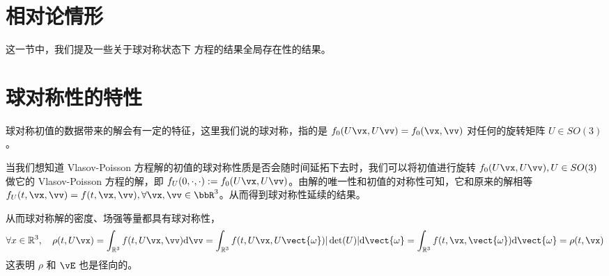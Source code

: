 
\section{相对论情形}
\label{cha:global-RVP}
这一节中，我们提及一些关于球对称状态下 \eqrvp 方程的结果全局存在性的结果。

\section{球对称性的特性}
球对称初值的数据带来的解会有一定的特征，这里我们说的球对称，指的是 $f_0(U\vx,U\vv)=f_0(\vx,\vv)$ 对任何的旋转矩阵 $U\in SO(3)$。

当我们想知道 Vlasov-Poisson 方程解的初值的球对称性质是否会随时间延拓下去时，我们可以将初值进行旋转 $f_0(U\vx,U\vv), U\in SO(3)$ 做它的 Vlasov-Poisson 方程的解，即 $f_U(0,\cdot,\cdot):=f_0(U\vx,U\vv)$。由解的唯一性和初值的对称性可知，它和原来的解相等 $f_U(t,\vx,\vv) = f(t,\vx,\vv), \forall \vx,\vv \in \bbR^3$。从而得到球对称性延续的结果。

从而球对称解的密度、场强等量都具有球对称性，
\[
\forall x \in \mathbb{R}^{3}, \quad \rho(t, U \vx)=\int_{\mathbb{R}^{3}} f(t, U\vx, \vv) \mathrm{d} \vv=\int_{\mathbb{R}^{3}} f(t, U \vx, U \vect{\omega})|\operatorname{det}(U)| \mathrm{d} \vect{\omega}=\int_{\mathbb{R}^{3}} f(t, \vx, \vect{\omega}) \mathrm{d} \vect{\omega}=\rho(t, \vx)
\]
这表明 $\rho$ 和 $\vE$ 也是径向的。


